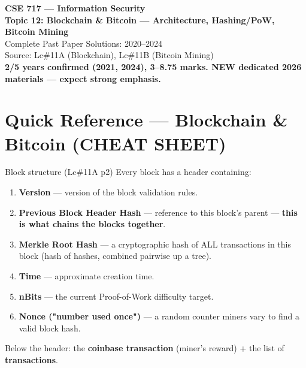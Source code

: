 \documentclass[12pt,a4paper]{article}
\begin{document}
\begin{center}
{\LARGE\bfseries\color{folblue} CSE 717 --- Information Security}\\[4pt]
{\large\bfseries Topic 12: Blockchain \& Bitcoin --- Architecture, Hashing/PoW, Bitcoin Mining}\\[2pt]
{\large Complete Past Paper Solutions: 2020--2024}\\[6pt]
{\normalsize Source: Lc\#11A (Blockchain), Lc\#11B (Bitcoin Mining)}\\[2pt]
{\normalsize\color{darkred}\textbf{2/5 years confirmed (2021, 2024), 3--8.75 marks. NEW dedicated 2026 materials --- expect strong emphasis.}}
\end{center}

\tableofcontents

\section*{Quick Reference --- Blockchain \& Bitcoin (CHEAT SHEET)}

\begin{algobox}{Block structure (Lc\#11A p2)}
Every block has a header containing:
\begin{enumerate}[noitemsep]
  \item \textbf{Version} --- version of the block validation rules.
  \item \textbf{Previous Block Header Hash} --- reference to this block's parent --- \textbf{this is what chains the blocks together}.
  \item \textbf{Merkle Root Hash} --- a cryptographic hash of ALL transactions in this block (hash of hashes, combined pairwise up a tree).
  \item \textbf{Time} --- approximate creation time.
  \item \textbf{nBits} --- the current Proof-of-Work difficulty target.
  \item \textbf{Nonce ("number used once")} --- a random counter miners vary to find a valid block hash.
\end{enumerate}
Below the header: the \textbf{coinbase transaction} (miner's reward) + the list of \textbf{transactions}.
\end{algobox}
\end{document}

